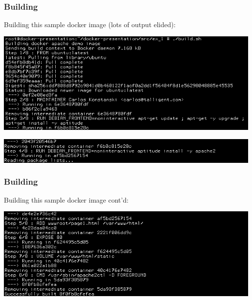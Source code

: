 \documentclass[helvetica,english,utf8,notitle,nologo]{beamer}
\begin{document}
\begin{frame}
  \frametitle{Building}

  Building this sample docker image (lots of output elided):

  \includegraphics[scale=0.44]{image_2}

  \includegraphics[scale=0.44]{image_5}
\end{frame}

\begin{frame}
  \frametitle{Building}

  Building this sample docker image cont'd:

  \includegraphics[scale=0.44]{image_6}
\end{frame}
\end{document}
